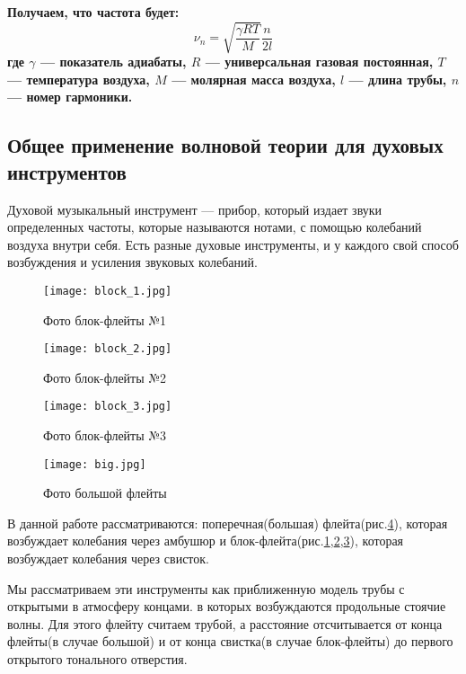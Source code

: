 \textbf{
Получаем, что частота будет:
\begin{equation}
    \nu_{n} =  \sqrt{\frac{\gamma R T}{M}}\frac{n}{2l}
\end{equation}
где $\gamma$ --- показатель адиабаты, $R$ --- универсальная газовая постоянная, $T$ --- температура воздуха, $M$ --- молярная масса воздуха, $l$ --- длина трубы, $n$ --- номер гармоники.
}
\newpage
\subsection{Общее применение волновой теории для духовых инструментов}

Духовой музыкальный инструмент --- прибор, который издает звуки  определенных частоты, которые называются нотами, с помощью колебаний воздуха внутри себя. Есть разные духовые инструменты, и  у каждого свой способ возбуждения и усиления звуковых колебаний.

\begin{figure}[!ht]
    \centering
    \texttt{[image: block\_1.jpg]}
    \caption{Фото блок-флейты №1}
    \label{fig:foto_block_1}
\end{figure}
\begin{figure}[!ht]
    \centering
    \texttt{[image: block\_2.jpg]}
    \caption{Фото блок-флейты №2}
    \label{fig:foto_block_2}
\end{figure}
\begin{figure}[!ht]
    \centering
    \texttt{[image: block\_3.jpg]}
    \caption{Фото блок-флейты №3}
    \label{fig:foto_block_3}
\end{figure}
\begin{figure}[!ht]
    \centering
    \texttt{[image: big.jpg]}
    \caption{Фото большой флейты}
    \label{fig:foto_big}
\end{figure}

В данной работе рассматриваются: поперечная(большая) флейта(рис.\ref{fig:foto_big}), которая возбуждает колебания через амбушюр и блок-флейта(рис.\ref{fig:foto_block_1},\ref{fig:foto_block_2},\ref{fig:foto_block_3}), которая возбуждает колебания через свисток. 

Мы рассматриваем эти инструменты как приближенную модель трубы с открытыми в атмосферу концами. в которых возбуждаются продольные стоячие волны. Для этого флейту считаем трубой, а расстояние отсчитывается от конца флейты(в случае большой) и от конца свистка(в случае блок-флейты) до первого открытого тонального отверстия.


